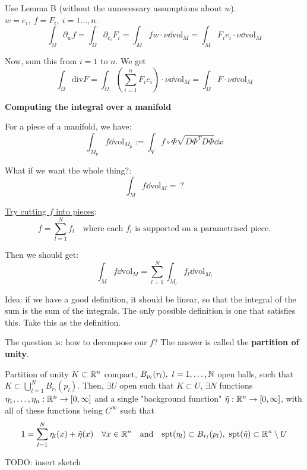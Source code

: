 \documentclass[12pt]{article}
\begin{document}
\begin{proofbox}
    Use Lemma B (without the unnecessary assumptions about $w$). $w = e_i,\ f = F_i,\ i = 1\dots,n$.
    $$
        \int_\Omega \partial_{w} f = \int_\Omega \partial_{e_i} F_i = \int_M f w  \cdot \nu \dd \mathrm{vol}_M = \int_M F_i e_i \cdot \nu \dd \mathrm{vol}_M
    $$

    Now, sum this from $i = 1$ to $n$. We get
    $$
        \int_{\Omega} \mathrm{div} F = \int_\Omega \left(\sum_{i = 1}^{n} F_i e_i\right) \cdot \nu \dd \mathrm{vol}_M = \int_\Omega F\cdot \nu \dd \mathrm{vol}_M
    $$
\end{proofbox}

\textbf{Computing the integral over a manifold}

For a piece of a manifold, we have:
$$
    \int_{M_p} f \dd \mathrm{vol}_{M_p} := \int_V f \circ \Phi \sqrt{D \Phi^T D \Phi} \dd x
$$

What if we want the whole thing?:
$$
    \int_{M} f \dd \mathrm{vol}_{M} =\ ?
$$

\underline{Try cutting $f$ into pieces}:
$$
    f = \sum_{l = 1}^{N} f_l \quad\text{where each } f_l \text{ is supported on a parametrised piece.}
$$

Then we should get:
$$
    \int_{M} f \dd \mathrm{vol}_{M} = \sum_{l = 1}^{N} \int_{M_l} f_l \dd \mathrm{vol}_{M_l}
$$

Idea: if we have a good definition, it should be linear, so that the integral of the sum is the sum of the integrals. The only possible definition is one that satisfies this. Take this as the definition.

The question is: how to decompose our $f$? The answer is called the \textbf{partition of unity}.

\begin{lemma}{Partition of unity}{}
    $K \subset \mathbb{R}^n$ compact, $B_{p_l}(r_l),\ l = 1,\dots,\mathbb{N}$ open balls, such that $K \subset \bigcup\limits_{l = 1}^N B_{r_l}(p_l)$. Then, $\exists U$ open such that $K \subset U$, $\exists N$ functions $\eta_1,\dots,\eta_n : \mathbb{R}^n \rightarrow [0, \infty]$ and a single "background function" $\tilde{\eta}: \mathbb{R}^n \rightarrow [0, \infty]$, with all of these functions being $C^\infty$ such that
    $$
        1 = \sum_{l = 1}^{N} \eta_l(x) + \tilde{\eta}(x) \quad \forall x \in \mathbb{R}^n \quad  \text{and} \quad \mathrm{spt}(\eta_l) \subset B_{r_l}(p_l),\ \mathrm{spt}(\tilde{\eta}) \subset \mathbb{R}^n \setminus U
    $$
\end{lemma}

TODO: insert sketch
\end{document}
